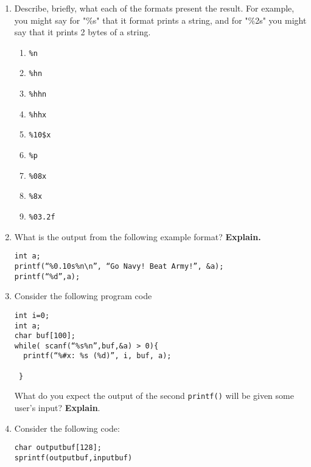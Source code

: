 \documentclass{article}[9pt]
\begin{document}
\begin{enumerate}
\item Describe, briefly, what each of the formats present the
result. For example, you might say for "\%s" that it format prints
a string, and for "\%2s" you might say that it prints 2 bytes of a
string.

\begin{enumerate}
\item \texttt{\%n}

\item \texttt{\%hn}

\item \texttt{\%hhn}

\item \texttt{\%hhx}

\item \texttt{\%10\$x}

\item \texttt{\%p}

\item \texttt{\%08x}

\item \texttt{\%8x}

\item \texttt{\%03.2f}
\end{enumerate}

\item What is the output from the following example format? \textbf{Explain.}

\begin{verbatim}
int a;
printf(“%0.10s%n\n”, “Go Navy! Beat Army!”, &a);
printf(“%d”,a);
\end{verbatim}

\item Consider the following program code

\begin{verbatim}
int i=0;
int a;
char buf[100];
while( scanf(“%s%n”,buf,&a) > 0){
  printf(“%#x: %s (%d)”, i, buf, a);

 }     
\end{verbatim}

What do you expect the output of the second \texttt{printf()} will be
given some user's input? \textbf{Explain}.

\item Consider the following code:

\begin{verbatim}
char outputbuf[128];
sprintf(outputbuf,inputbuf)
\end{verbatim}


\end{enumerate}
\end{document}
